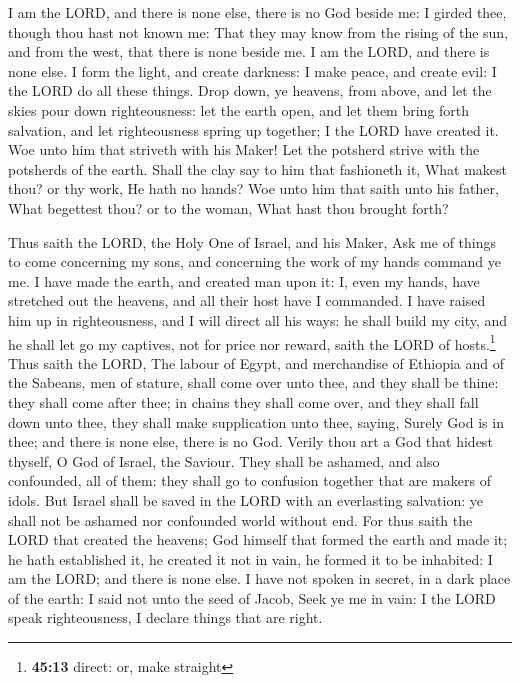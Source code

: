  I am the LORD, and there is none else, there is no God
beside me: I girded thee, though thou hast not known me: 
That they may know from the rising of the sun, and from the west, that
there is none beside me. I am the LORD, and there is none else.
 I form the light, and create darkness: I make peace, and
create evil: I the LORD do all these things.  Drop down,
ye heavens, from above, and let the skies pour down righteousness: let
the earth open, and let them bring forth salvation, and let
righteousness spring up together; I the LORD have created it.
 Woe unto him that striveth with his Maker! Let the
potsherd strive with the potsherds of the earth. Shall the clay say to
him that fashioneth it, What makest thou? or thy work, He hath no hands?
 Woe unto him that saith unto his father, What begettest
thou? or to the woman, What hast thou brought forth?

 Thus saith the LORD, the Holy One of Israel, and his
Maker, Ask me of things to come concerning my sons, and concerning the
work of my hands command ye me.  I have made the earth,
and created man upon it: I, even my hands, have stretched out the
heavens, and all their host have I commanded.  I have
raised him up in righteousness, and I will direct all his ways: he shall
build my city, and he shall let go my captives, not for price nor
reward, saith the LORD of hosts.\footnote{\textbf{45:13} direct: or,
  make straight}  Thus saith the LORD, The labour of
Egypt, and merchandise of Ethiopia and of the Sabeans, men of stature,
shall come over unto thee, and they shall be thine: they shall come
after thee; in chains they shall come over, and they shall fall down
unto thee, they shall make supplication unto thee, saying, Surely God is
in thee; and there is none else, there is no God.  Verily
thou art a God that hidest thyself, O God of Israel, the Saviour.
 They shall be ashamed, and also confounded, all of them:
they shall go to confusion together that are makers of idols.
 But Israel shall be saved in the LORD with an
everlasting salvation: ye shall not be ashamed nor confounded world
without end.  For thus saith the LORD that created the
heavens; God himself that formed the earth and made it; he hath
established it, he created it not in vain, he formed it to be inhabited:
I am the LORD; and there is none else.  I have not spoken
in secret, in a dark place of the earth: I said not unto the seed of
Jacob, Seek ye me in vain: I the LORD speak righteousness, I declare
things that are right.

